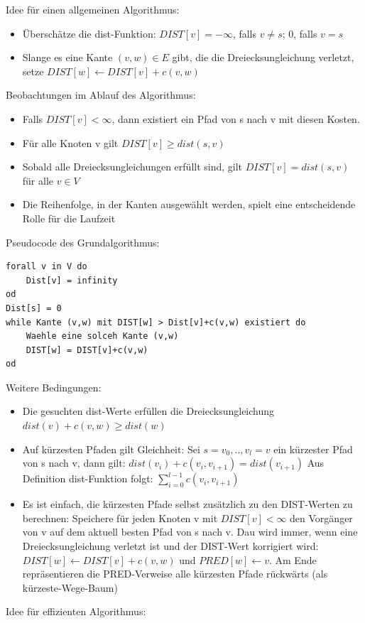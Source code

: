 \documentclass[a4paper]{article}
\begin{document}
Idee für einen allgemeinen Algorithmus:\begin{itemize}
\item Überschätze die dist-Funktion: $DIST[v]=-\infty$, falls $v\neq s$; 0, falls $v=s$
\item Slange es eine Kante $(v,w)\in E$ gibt, die die Dreiecksungleichung verletzt, setze $DIST[w] \leftarrow DIST[v]+c(v,w)$\\
\end{itemize}
Beobachtungen im Ablauf des Algorithmus:
\begin{itemize}
\item Falls $DIST[v]<\infty$, dann existiert ein Pfad von s nach v mit diesen Kosten.
\item Für alle Knoten v gilt $DIST[v] \geq dist(s,v)$
\item Sobald alle Dreiecksungleichungen erfüllt sind, gilt $DIST[v]=dist(s,v)$ für alle $v\in V$
\item Die Reihenfolge, in der Kanten ausgewählt werden, spielt eine entscheidende Rolle für die Laufzeit
\end{itemize}
Pseudocode des Grundalgorithmus:\\
\begin{lstlisting}
forall v in V do
	Dist[v] = infinity 
od
Dist[s] = 0
while Kante (v,w) mit DIST[w] > Dist[v]+c(v,w) existiert do
	Waehle eine solceh Kante (v,w)
	DIST[w] = DIST[v]+c(v,w)
od
\end{lstlisting}
Weitere Bedingungen: \begin{itemize}
\item Die gesuchten dist-Werte erfüllen die Dreiecksungleichung $dist(v)+c(v,w)\geq dist(w)$
\item Auf kürzesten Pfaden gilt Gleichheit: Sei $s=v_0,..,v_l=v$ ein kürzester Pfad von s nach v, dann gilt: $dist(v_i)+c(v_i,v_{i+1})=dist(v_{i+1})$ Aus Definition dist-Funktion folgt: $\sum_{i=0}^{l-1}c(v_i,v_{i+1})$
\item Es ist einfach, die kürzesten Pfade selbst zusätzlich zu den DIST-Werten zu berechnen: Speichere für jeden Knoten v mit $DIST[v]<\infty$ den Vorgänger von v auf dem aktuell besten Pfad von s nach v. Dau wird immer, wenn eine Dreiecksungleichung verletzt ist und der DIST-Wert korrigiert wird: $DIST[w] \leftarrow DIST[v]+c(v,w)$ und $PRED[w]\leftarrow v$.
Am Ende repräsentieren die PRED-Verweise alle kürzesten Pfade rückwärts (als kürzeste-Wege-Baum)
\end{itemize}
Idee für effizienten Algorithmus: \\
\end{document}
